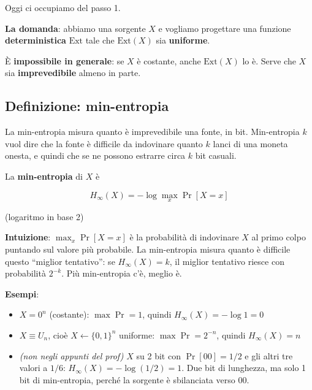 Oggi ci occupiamo del passo 1.

\textbf{La domanda}: abbiamo una sorgente \(X\) e vogliamo progettare una funzione \textbf{deterministica} \(\text{Ext}\) tale che \(\text{Ext}(X)\) sia \textbf{uniforme}.

È \textbf{impossibile in generale}: se \(X\) è costante, anche \(\text{Ext}(X)\) lo è. Serve che \(X\) sia \textbf{imprevedibile} almeno in parte.

\subsection{Definizione: min-entropia}

\begin{inbreve}

La min-entropia misura quanto è imprevedibile una fonte, in bit. Min-entropia \(k\) vuol dire che la fonte è difficile da indovinare quanto \(k\) lanci di una moneta onesta, e quindi che se ne possono estrarre circa \(k\) bit casuali.

\end{inbreve}

La \textbf{min-entropia} di \(X\) è

\[
H_\infty(X) = -\log \max_x \Pr[X = x]
\]

(logaritmo in base 2)

\textbf{Intuizione}: \(\max_x \Pr[X = x]\) è la probabilità di indovinare \(X\) al primo colpo puntando sul valore più probabile. La min-entropia misura quanto è difficile questo ``miglior tentativo'': se \(H_\infty(X) = k\), il miglior tentativo riesce con probabilità \(2^{-k}\). Più min-entropia c'è, meglio è.

\begin{esempio}

\textbf{Esempi}:

\begin{itemize}
\item
  \(X = 0^n\) (costante): \(\max \Pr = 1\), quindi \(H_\infty(X) = -\log 1 = 0\)
\item
  \(X \equiv U_n\), cioè \(X \leftarrow \{0,1\}^n\) uniforme: \(\max \Pr = 2^{-n}\), quindi \(H_\infty(X) = n\)
\item
  \emph{(non negli appunti del prof)} \(X\) su 2 bit con \(\Pr[00] = 1/2\) e gli altri tre valori a \(1/6\): \(H_\infty(X) = -\log(1/2) = 1\). Due bit di lunghezza, ma solo 1 bit di min-entropia, perché la sorgente è sbilanciata verso 00.
\end{itemize}

\end{esempio}

